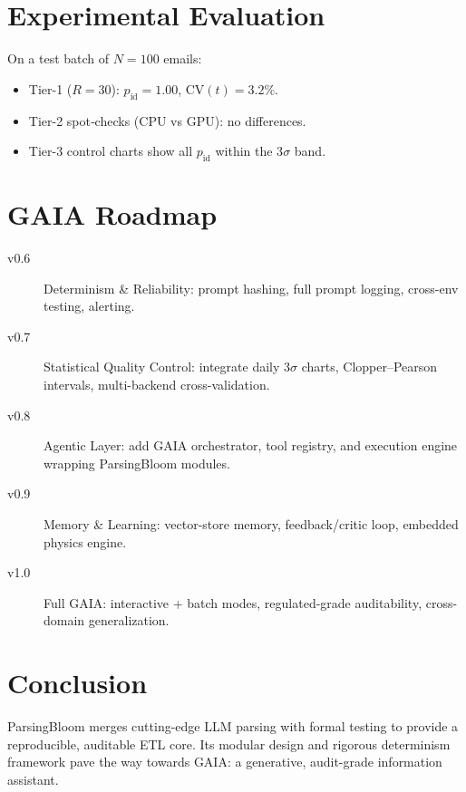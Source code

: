\documentclass{report}
\begin{document}
	\section{Experimental Evaluation}
	On a test batch of $N=100$ emails:
	\begin{itemize}
		\item Tier-1 ($R=30$): $p_{\mathrm{id}}=1.00$, CV$(t)=3.2\%$.  
		\item Tier-2 spot‐checks (CPU vs GPU): no differences.  
		\item Tier-3 control charts show all $p_{\mathrm{id}}$ within the 3$\sigma$ band.  
	\end{itemize}
	
	\section{GAIA Roadmap}
	\begin{description}
		\item[v0.6] Determinism \& Reliability: prompt hashing, full prompt logging, cross-env testing, alerting.  
		\item[v0.7] Statistical Quality Control: integrate daily 3$\sigma$ charts, Clopper–Pearson intervals, multi-backend cross-validation.  
		\item[v0.8] Agentic Layer: add GAIA orchestrator, tool registry, and execution engine wrapping ParsingBloom modules.  
		\item[v0.9] Memory \& Learning: vector-store memory, feedback/critic loop, embedded physics engine.  
		\item[v1.0] Full GAIA: interactive + batch modes, regulated-grade auditability, cross-domain generalization.  
	\end{description}
	
	\section{Conclusion}
	ParsingBloom merges cutting-edge LLM parsing with formal testing to provide a reproducible, auditable ETL core. Its modular design and rigorous determinism framework pave the way towards GAIA: a generative, audit-grade information assistant.
	
\end{document}
